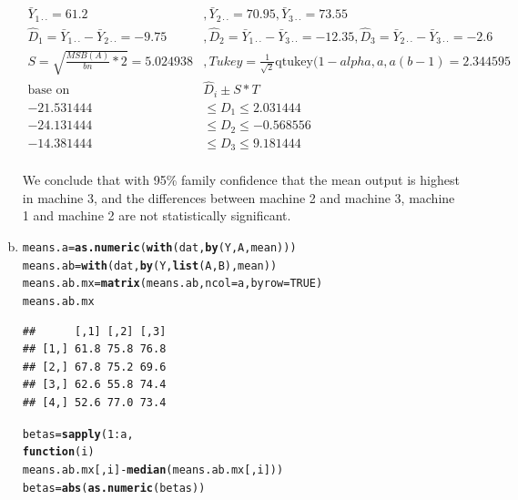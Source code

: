 \documentclass{article}\usepackage[]{graphicx}\usepackage[]{color}
\makeatletter
\newcommand{\hlnum}[1]{\textcolor[rgb]{0.686,0.059,0.569}{#1}}%
\newcommand{\hlopt}[1]{\textcolor[rgb]{0,0,0}{#1}}%
\newcommand{\hlstd}[1]{\textcolor[rgb]{0.345,0.345,0.345}{#1}}%
\newcommand{\hlkwa}[1]{\textcolor[rgb]{0.161,0.373,0.58}{\textbf{#1}}}%
\newcommand{\hlkwb}[1]{\textcolor[rgb]{0.69,0.353,0.396}{#1}}%
\newcommand{\hlkwc}[1]{\textcolor[rgb]{0.333,0.667,0.333}{#1}}%
\newcommand{\hlkwd}[1]{\textcolor[rgb]{0.737,0.353,0.396}{\textbf{#1}}}%
\newenvironment{kframe}{%
 \def\at@end@of@kframe{}%
 \ifinner\ifhmode%
  \def\at@end@of@kframe{\end{minipage}}%
  \begin{minipage}{\columnwidth}%
 \fi\fi%
 \def\FrameCommand##1{\hskip\@totalleftmargin \hskip-\fboxsep
 \colorbox{shadecolor}{##1}\hskip-\fboxsep
     \hskip-\linewidth \hskip-\@totalleftmargin \hskip\columnwidth}%
 \MakeFramed {\advance\hsize-\width
   \@totalleftmargin\z@ \linewidth\hsize
   \@setminipage}}%
 {\par\unskip\endMakeFramed%
 \at@end@of@kframe}
\newenvironment{knitrout}{}{} %
\makeatother
\begin{document}
\begin{enumerate}[(a)]
\begin{displaymath}
\begin{split}
\bar{Y}_{1\cdot \cdot} = 61.2 &, \bar{Y}_{2\cdot \cdot} = 70.95 , \bar{Y}_{3\cdot \cdot} = 73.55 \\
\hat{D}_1 = \bar{Y}_{1\cdot \cdot}-\bar{Y}_{2\cdot \cdot} = -9.75 &,  \hat{D}_2 = \bar{Y}_{1\cdot \cdot}-\bar{Y}_{3\cdot \cdot}=-12.35 , \hat{D}_3 = \bar{Y}_{2\cdot \cdot}-\bar{Y}_{3\cdot \cdot}=-2.6 \\
S = \sqrt{\frac{MSB(A)}{bn}*2} = 5.024938 &, Tukey = \frac{1}{\sqrt{2}}\text{qtukey}(1-alpha, a, a(b-1)=2.344595\\
\text{base on} &\hat{D}_i \pm S*T\\
-21.531444 & \leq D_1 \leq 2.031444   \\
-24.131444 &\leq D_2 \leq -0.568556 \\
-14.381444 &\leq D_3 \leq 9.181444   \\
\end{split}
\end{displaymath}

\qquad We conclude that with 95\% family confidence that the mean output is highest in machine 3, and the differences between machine 2 and machine 3, machine 1 and machine 2 are not statistically significant.

\item

\begin{knitrout}
\color{fgcolor}\begin{kframe}
\begin{alltt}
  \hlstd{means.a} \hlkwb{=} \hlkwd{as.numeric}\hlstd{(}\hlkwd{with}\hlstd{(dat,} \hlkwd{by}\hlstd{(Y, A, mean)))}
  \hlstd{means.ab} \hlkwb{=} \hlkwd{with}\hlstd{(dat,} \hlkwd{by}\hlstd{(Y,} \hlkwd{list}\hlstd{(A, B), mean))}
  \hlstd{means.ab.mx} \hlkwb{=} \hlkwd{matrix}\hlstd{(means.ab,} \hlkwc{ncol} \hlstd{= a,} \hlkwc{byrow} \hlstd{=}  \hlnum{TRUE}\hlstd{)}
  \hlstd{means.ab.mx}
\end{alltt}
\begin{verbatim}
##      [,1] [,2] [,3]
## [1,] 61.8 75.8 76.8
## [2,] 67.8 75.2 69.6
## [3,] 62.6 55.8 74.4
## [4,] 52.6 77.0 73.4
\end{verbatim}
\begin{alltt}
  \hlstd{betas} \hlkwb{=} \hlkwd{sapply}\hlstd{(}\hlnum{1}\hlopt{:}\hlstd{a,}
                 \hlkwa{function}\hlstd{(}\hlkwc{i}\hlstd{)}
                   \hlstd{means.ab.mx[,i]} \hlopt{-} \hlkwd{median}\hlstd{(means.ab.mx[,i]))}
  \hlstd{betas} \hlkwb{=} \hlkwd{abs}\hlstd{(}\hlkwd{as.numeric}\hlstd{(betas))}


\end{alltt}
\end{kframe}
\end{knitrout}
\end{enumerate}
\end{document}

